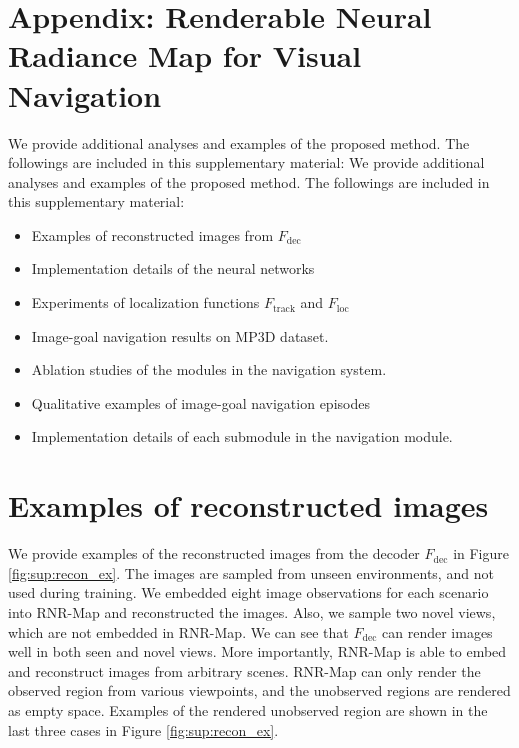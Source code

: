 \documentclass[10pt,twocolumn,letterpaper]{article}
\begin{document}
\section*{Appendix: Renderable Neural Radiance Map for Visual Navigation}
We provide additional analyses and examples of the proposed method. The followings are included in this supplementary material:
We provide additional analyses and examples of the proposed method. The followings are included in this supplementary material:
\begin{itemize}
    \item[\ref{appendix:rec_ex}] Examples of reconstructed images from $F_\mathrm{dec}$ 
    \item[\ref{appendix:implementation_details}] Implementation details of the neural networks
    \item[\ref{appendix:exp_loc}] Experiments of localization functions $F_\mathrm{track}$ and $F_\mathrm{loc}$
    \item[\ref{appendix:navi_mp3d}] Image-goal navigation results on MP3D\cite{mp3d} dataset.
    \item[\ref{appendix:navi_ab}] Ablation studies of the modules in the navigation system.
    \item[\ref{appendix:navi}] Qualitative examples of image-goal navigation episodes
    \item[\ref{appendix:impd_navi}] Implementation details of each submodule in the navigation module.
\end{itemize}


\section{Examples of reconstructed images} \label{appendix:rec_ex}
We provide examples of the reconstructed images from the decoder $F_\mathrm{dec}$ in Figure \ref{fig:sup:recon_ex}.
%
The images are sampled from unseen environments, and not used during training.
%
We embedded eight image observations for each scenario into RNR-Map and reconstructed the images.
%
Also, we sample two novel views, which are not embedded in RNR-Map.
%
We can see that $F_\mathrm{dec}$ can render images well in both seen and novel views.
%
More importantly, RNR-Map is able to embed and reconstruct images from arbitrary scenes.
%
RNR-Map can only render the observed region from various viewpoints, and the unobserved regions are rendered as empty space.
%
Examples of the rendered unobserved region are shown in the last three cases in Figure \ref{fig:sup:recon_ex}.
\end{document}
